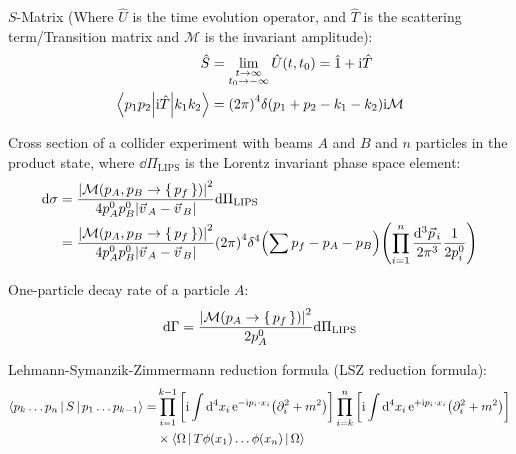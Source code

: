 		\noindent
		$S$-Matrix (Where $\hat{U}$ is the time evolution operator, and $\hat{T}$ is the scattering term/Transition matrix and $\mathcal{M}$ is the invariant amplitude):
		\begin{equation}
			\begin{aligned}
				\hat{S} &= \lim_{\substack{t\rightarrow\infty\\t_0\rightarrow-\infty}} \hat{U}(t,t_0) = \hat{1} + \mathrm{i} \hat{T} \\
				\mel**{p_{1}p_{2}}{\mathrm{i} \hat{T}}{k_{1}k_{2}} &= \qty(2\pi)^4\delta(p_1 + p_2 - k_1 - k_2) \mathrm{i} \mathcal{M} \\
			\end{aligned}
		\end{equation}

		\noindent
		Cross section of a collider experiment with beams $A$ and $B$ and $n$ particles in the product state, where $\dd \Pi_\mathrm{LIPS}$ is the Lorentz invariant phase space element:
		\begin{equation}
			\begin{aligned}
				\dd \sigma 
				&= \frac{\abs{\mathcal{M}(p_A,p_B\rightarrow\set{p_f})}^2}{4p_A^0 p_B^0 \abs{\vec{v}_A - \vec{v}_B}} \dd \Pi_\mathrm{LIPS} \\
				&= \frac{\abs{\mathcal{M}(p_A,p_B\rightarrow\set{p_f})}^2}{4p_A^0 p_B^0 \abs{\vec{v}_A - \vec{v}_B}}  \qty(2\pi)^4 \delta^4 \qty(\sum p_{f} - p_A - p_B) \qty(\prod_{i=1}^{n} \frac{\dd^3 \vec{p}_i}{2 \pi^3} \frac{1}{2 p_i^0})
			\end{aligned}
		\end{equation} 

		\noindent
		One-particle decay rate of a particle $A$:
		\begin{equation}
			\dd \Gamma = \frac{\abs{\mathcal{M}(p_A\rightarrow\set{p_f})}^2}{2 p_A^0} \dd \Pi_\mathrm{LIPS}
		\end{equation}

		\noindent
		Lehmann-Symanzik-Zimmermann reduction formula (LSZ reduction formula):
		\begin{equation}
			\begin{aligned}
				\Braket{p_k \hdots p_n|S|p_1 \hdots p_{k-1}} = &\prod_{i=1}^{k-1} \qty[\mathrm{i} \int \dd^4 x_i \, \mathrm{e}^{-\mathrm{i} p_i\cdot x_i} \qty(\partial^2_i+m^2)] \prod_{i=k}^{n} \qty[\mathrm{i} \int \dd^4 x_i \, \mathrm{e}^{+\mathrm{i} p_i\cdot x_i} \qty(\partial^2_i+m^2)] \\
				&\times\Braket{\Omega|T \phi(x_1) \hdots \phi(x_n)|\Omega}
			\end{aligned}
		\end{equation}
			
